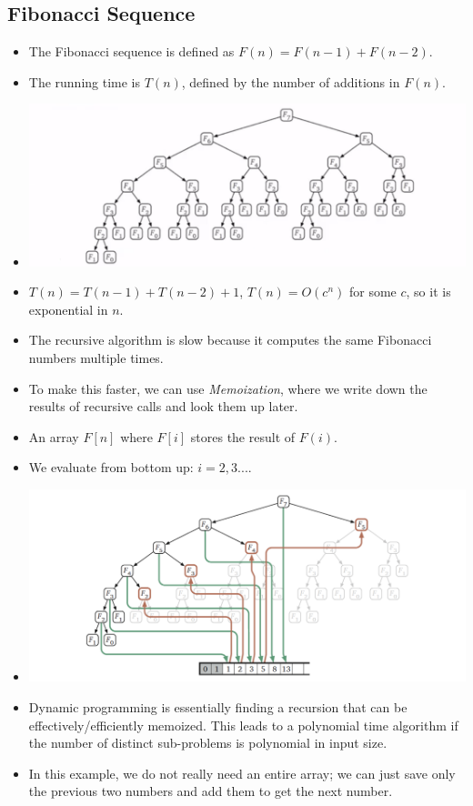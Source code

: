\documentclass[12pt]{article}
\begin{document}
\subsection{Fibonacci Sequence}
\begin{itemize}
    \item The Fibonacci sequence is defined as $F(n) = F(n - 1) + F(n - 2)$.
    \item The running time is $T(n)$, defined by the number of additions in $F(n)$.
    \item[] \includegraphics[width=\textwidth]{images/fib-without-memo.png}
    \item $T(n) = T(n - 1) + T(n - 2) + 1$, $T(n) = O(c^n)$ for some $c$, so it is exponential in $n$.
    \item The recursive algorithm is slow because it computes the same Fibonacci numbers multiple times.
    \item To make this faster, we can use \textit{Memoization}, where we write down the results of recursive calls and look them up later.
    \item An array $F[n]$ where $F[i]$ stores the result of $F(i)$.
    \item We evaluate from bottom up: $i = 2, 3...$.
    \item[] \includegraphics[width=\textwidth]{images/fib-with-memo.png}
    \item Dynamic programming is essentially finding a recursion that can be effectively/efficiently memoized. This leads to a polynomial time algorithm if the number of distinct sub-problems is polynomial in input size.
    \item In this example, we do not really need an entire array; we can just save only the previous two numbers and add them to get the next number.
\end{itemize}
\end{document}
